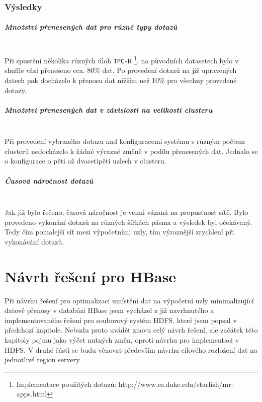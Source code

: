 \documentclass[thesis=M,czech]{FITthesis}[2012/06/26]
\begin{document}
\subsection{Výsledky}

\paragraph{Množství přenesených dat pro různé typy dotazů} \hfill \\
Při spustění několika různých úloh \texttt{TPC-H} \footnote{Implementace použitých dotazů: http://www.cs.duke.edu/starfish/mr-apps.html}.  na původních datasetech bylo v shuffle vázi přeneseno cca. 80\% dat. Po provedení dotazů na již upravených datech pak docházelo k přenosu dat  nižším než 10\% pro všechny provedené dotazy.

\paragraph{Množství přenesených dat v závislosti na velikosti clusteru} \hfill \\
Při provedení vybraného dotazu nad konfiguracemi systému s různým počtem clusterů nedocházelo k žádné výrazné změně v podílu přenesených dat. Jednalo se o konfigurace o pěti až dvacetipěti uzlech v clusteru.

\paragraph{Časová náročnost dotazů} \hfill \\
Jak již bylo řečeno, časová náročnost je velmi vázaná na propustnost sítě. Bylo provedeno vykonání dotazů na různých šířkách pásma a výsledek byl očekávaný. Tedy čím pomalejší síť mezi výpočetními uzly, tím výraznější zrychlení při vykonávání dotazů.






\chapter{Návrh řešení pro HBase}
Při návrhu řešení pro optimalizaci umístění dat na výpočetní uzly minimalizující datové přenosy v databázi HBase jsem vycházel z již navrhnutého a implementovaného řešení pro souborový systém HDFS, které jsem popsal v předchozí kapitole. Nebudu proto uvádět znovu celý návrh řešení, ale začátek této kapitoly pojmu jako výčet nutných změn, oproti návrhu pro implementaci v HDFS. V druhé části se budu věnovat především návrhu cílového rozložení dat na jednotlivé region servery.
\end{document}
